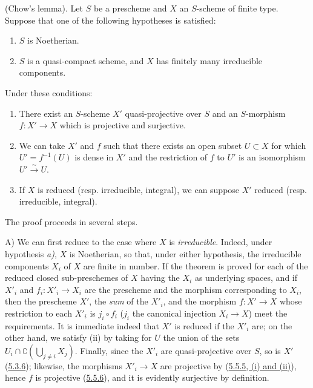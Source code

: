 \begin{theorem}[5.6.1]
\label{II.5.6.1}
(Chow's lemma). Let $S$ be a prescheme and $X$ an $S$-scheme of finite type.
Suppose that one of the following hypotheses is satisfied:
\begin{enumerate}
  \item[\rm{a)}] $S$ is Noetherian.
  \item[\rm{b)}] $S$ is a quasi-compact scheme, and $X$ has finitely many
  irreducible components.
\end{enumerate}
Under these conditions:
\begin{enumerate}
  \item[\rm{(i)}] There exist an $S$-scheme $X'$ \textup{quasi-projective} over $S$
  and an $S$-morphism $f:X'\to X$ which is \textup{projective} and \textup{surjective}.
  \item[\rm{(ii)}] We can take $X'$ and $f$ such that there exists an open
  subset $U\subset X$ for which $U'=f^{-1}(U)$ is dense in $X'$ and the
  restriction of $f$ to $U'$ is an isomorphism $U'\xrightarrow{\sim}U$.
  \item[\rm{(iii)}] If $X$ is reduced \textup{(resp.} irreducible, integral), we can
  suppose $X'$ reduced \textup{(resp.} irreducible, integral).
\end{enumerate}
\end{theorem}

The proof proceeds in several steps.

A) We can first reduce to the case where $X$ is \emph{irreducible}. Indeed, under
hypothesis \emph{a)}, $X$ is Noetherian, so that, under either hypothesis, the
irreducible components $X_i$ of $X$ are finite in number. If the theorem is
proved for each of the reduced closed sub-preschemes of $X$ having the $X_i$
as underlying spaces, and if $X'_i$ and $f_i:X'_i\to X_i$ are the prescheme
and the morphism corresponding to $X_i$, then the prescheme $X'$, the \emph{sum} of
the $X'_i$, and the morphism $f:X'\to X$ whose restriction to each $X'_i$ is
$j_i\circ f_i$ ($j_i$ the canonical injection $X_i\to X$) meet the
requirements. It is immediate indeed that $X'$ is reduced if the $X'_i$ are;
on the other hand, we satisfy (ii) by taking for $U$ the union of the sets
$U_i\cap\complement(\bigcup_{j\neq i}X_j)$. Finally, since the $X'_i$ are
quasi-projective over $S$, so is $X'$
(\hyperref[II.5.3.6]{5.3.6}); likewise, the morphisms $X'_i\to X$ are
projective by (\hyperref[II.5.5.5]{5.5.5, (i) and (ii)}), hence $f$ is
projective (\hyperref[II.5.5.6]{5.5.6}), and it is evidently surjective by
definition.

